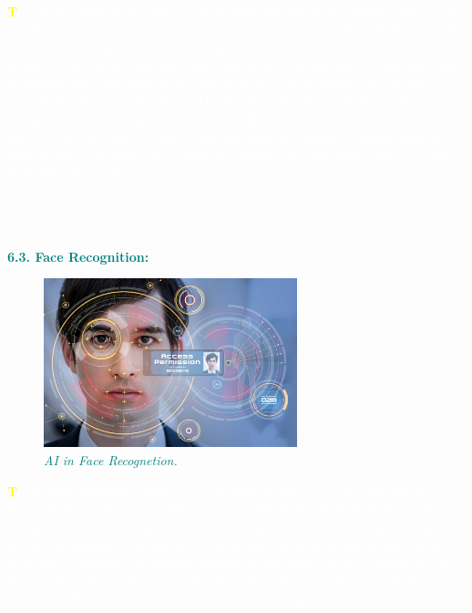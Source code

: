 \documentclass[12pt]{article}
\begin{document}
\textcolor{white}{\textbf{\textcolor{yellow}{\huge T}}he future application of AI in cybersecurity will ensure in curbing hackers. The incidence of cybercrime is an issue that has been escalating through the years. It costs enterprises in term of brand image as well as material cost. Credit card fraudery is one of the most prevalent cybercrimes. Despite there being detection techniques, they still prove to be ineffective in curbing hackers. AI can bring a remarkable change to this. Novel AI techniques like Recurrent Neural Networks can detect fraudery in initial stages itself. This fraud detection system will be able to scan thousands of transactions instantly and predict/ classify them into buckets. RNN can save a lot of time as it focuses on cases where there is a high probability for fraud.}\\\\\\\\[2cm]

\begin{large}
\textbf{\textcolor{teal}{6.3. Face Recognition:}}\\
\end{large}

\begin{figure}
\centering
\includegraphics[width=2.9in]{russia-startup-facial-recognition-ethnicity}

\caption{\textit{\textcolor{teal}{AI in Face Recognetion.}}}
\end{figure}

\textcolor{white}{\textbf{\textcolor{yellow}{\huge T}}he launch of iPhone x with face recognition feature was a step towards AI future. In the coming years,
 iPhone users might be to unlock their phones by looking into the front camera. Authenticating personal content is not the only use of facial recognition. Governments and security forces make use of this feature to track down criminals and identify citizens. In the future, facial recognition can go beyond physical structure to emotional analysis. For example, it might become possible to detect whether a person is stressed or angry.}\\
\end{document}
